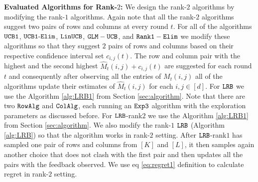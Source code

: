 \textbf{Evaluated Algorithms for Rank-$2$:} We design the rank-$2$ algorithms by modifying the rank-$1$ algorithms. Again note that all the rank-$2$ algorithms suggest two pairs of rows and columns at every round $t$. For all of the algorithms ${\tt UCB1}$, ${\tt UCB1\mbox{-}Elim}$, ${\tt LinUCB}$, $\tt GLM-UCB$, and $\tt Rank1-Elim$ we modify these algorithms so that they suggest $2$ pairs of rows and columns based on their respective confidence interval set $c_{i, j}(t)$. The row and column pair with the highest and the second highest $\hat{M}_{t}(i,j) + c_{i, j}(t)$ are suggested for each round $t$ and consequently after observing all the entries of $M_t(i,j)$ all of the algorithms update their estimates of $\hat{M}_{t}(i,j)$ for each $i,j \in [d]$. For ${\tt LRB}$ we use the Algorithm \ref{alg:LRB1} from Section \ref{sec:algorithm}. Note that there are two ${\tt RowAlg}$ and ${\tt ColAlg}$, each running an ${\tt Exp3}$ algorithm with the  exploration parameters as discussed before. For ${\tt LRB}$-rank$2$ we use the Algorithm \ref{alg:LRB1} from Section \ref{sec:algorithm}. We also modify the rank-$1$ ${\tt LRB}$ (Algorithm \ref{alg:LRB}) so that the algorithm works in rank-$2$ setting. After ${\tt LRB}$-rank$1$ has sampled one pair of rows and columns from $[K]$ and $[L]$, it then samples again another choice that does not clash with the first pair and then updates all the pairs with the feedback observed. We use eq \eqref{eq:regret1} definition to calculate regret in rank-$2$ setting.





